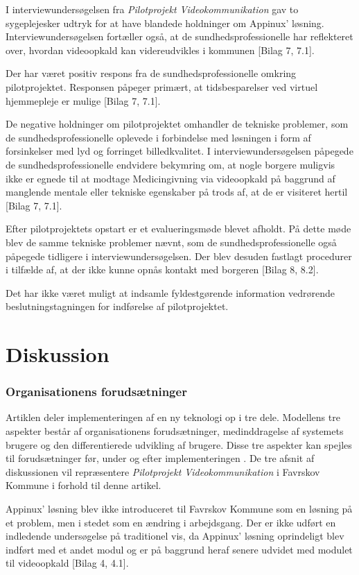I interviewundersøgelsen fra \textit{Pilotprojekt Videokommunikation} gav to sygeplejesker udtryk for at have blandede holdninger om Appinux' løsning. Interviewundersøgelsen fortæller også, at de sundhedsprofessionelle har reflekteret over, hvordan videoopkald kan videreudvikles i kommunen [Bilag 7, 7.1]. 

Der har været positiv respons fra de sundhedsprofessionelle omkring pilotprojektet. Responsen påpeger primært, at tidsbesparelser ved virtuel hjemmepleje er mulige [Bilag 7, 7.1].

De negative holdninger om pilotprojektet omhandler de tekniske problemer, som de sundhedsprofessionelle oplevede i forbindelse med løsningen i form af forsinkelser med lyd og forringet billedkvalitet. I interviewundersøgelsen påpegede de sundhedsprofessionelle endvidere bekymring om, at nogle borgere muligvis ikke er egnede til at modtage Medicingivning via videoopkald på baggrund af manglende mentale eller tekniske egenskaber på trods af, at de er visiteret hertil [Bilag 7, 7.1].   

Efter pilotprojektets opstart er et evalueringsmøde blevet afholdt. På dette møde blev de samme tekniske problemer nævnt, som de sundhedsprofessionelle også påpegede tidligere i interviewundersøgelsen. Der blev desuden fastlagt procedurer i tilfælde af, at der ikke kunne opnås kontakt med borgeren [Bilag 8, 8.2]. 

Det har ikke været muligt at indsamle fyldestgørende information vedrørende beslutningstagningen for indførelse af pilotprojektet.

  
\section{Diskussion}
\subsubsection{Organisationens forudsætninger}
Artiklen  deler implementeringen af en ny teknologi op i tre dele. Modellens tre aspekter består af organisationens forudsætninger, medinddragelse af systemets brugere og den differentierede udvikling af brugere. Disse tre aspekter kan spejles til forudsætninger før, under og efter implementeringen \cite{Ikt}. De tre afsnit af diskussionen vil repræsentere \textit{Pilotprojekt Videokommunikation} i Favrskov Kommune i forhold til denne artikel. 

Appinux’ løsning blev ikke introduceret til Favrskov Kommune som en løsning på et problem, men i stedet som en ændring i arbejdsgang. Der er ikke udført en indledende undersøgelse på traditionel vis, da Appinux' løsning oprindeligt blev indført med et andet modul og er på baggrund heraf senere udvidet med modulet til videoopkald [Bilag 4, 4.1]. 

